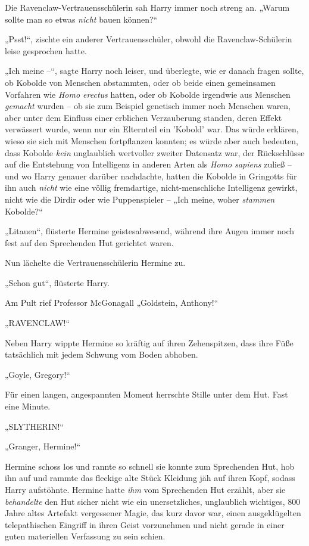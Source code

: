 Die Ravenclaw-Vertrauensschülerin sah Harry immer noch streng an. „Warum sollte man so etwas \emph{nicht} bauen können?“

„Psst!“, zischte ein anderer Vertrauensschüler, obwohl die Ravenclaw-Schülerin leise gesprochen hatte.

„Ich meine –“, sagte Harry noch leiser, und überlegte, wie er danach fragen sollte, ob Kobolde von Menschen abstammten, oder ob beide einen gemeinsamen Vorfahren wie \emph{Homo erectus} hatten, oder ob Kobolde irgendwie aus Menschen \emph{gemacht} wurden – ob sie zum Beispiel genetisch immer noch Menschen waren, aber unter dem Einfluss einer erblichen Verzauberung standen, deren Effekt verwässert wurde, wenn nur ein Elternteil ein 'Kobold' war. Das würde erklären, wieso sie sich mit Menschen fortpflanzen konnten; es würde aber auch bedeuten, dass Kobolde \emph{kein} unglaublich wertvoller zweiter Datensatz war, der Rückschlüsse auf die Entstehung von Intelligenz in anderen Arten als \emph{Homo sapiens} zuließ – und wo Harry genauer darüber nachdachte, hatten die Kobolde in Gringotts für ihn auch \emph{nicht} wie eine völlig fremdartige, nicht-menschliche Intelligenz gewirkt, nicht wie die Dirdir oder wie Puppenspieler – „Ich meine, woher \emph{stammen} Kobolde?“

„Litauen“, flüsterte Hermine geistesabwesend, während ihre Augen immer noch fest auf den Sprechenden Hut gerichtet waren.

Nun lächelte die Vertrauensschülerin Hermine zu.

„Schon gut“, flüsterte Harry.

Am Pult rief Professor McGonagall „Goldstein, Anthony!“

„RAVENCLAW!“

Neben Harry wippte Hermine so kräftig auf ihren Zehenspitzen, dass ihre Füße tatsächlich mit jedem Schwung vom Boden abhoben.

„Goyle, Gregory!“

Für einen langen, angespannten Moment herrschte Stille unter dem Hut. Fast eine Minute.

„SLYTHERIN!“

„Granger, Hermine!“

Hermine schoss los und rannte so schnell sie konnte zum Sprechenden Hut, hob ihn auf und rammte das fleckige alte Stück Kleidung jäh auf ihren Kopf, sodass Harry aufstöhnte. Hermine hatte \emph{ihm} vom Sprechenden Hut erzählt, aber sie \emph{behandelte } den Hut sicher nicht wie ein unersetzliches, unglaublich wichtiges, 800 Jahre altes Artefakt vergessener Magie, das kurz davor war, einen ausgeklügelten telepathischen Eingriff in ihren Geist vorzunehmen und nicht gerade in einer guten materiellen Verfassung zu sein schien.

